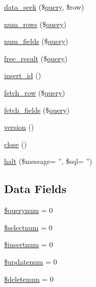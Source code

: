 \begin{DoxyCompactItemize}
\item 
\hyperlink{classdbstuff_a27a5c14df6b8da9758fdc49f38c78e7f}{data\+\_\+seek} (\$\hyperlink{classdbstuff_a00f34d535691c86e5674f6cace054c99}{query}, \$row)
\item 
\hyperlink{classdbstuff_abefe93c500ae2f81956a060a5c761c10}{num\+\_\+rows} (\$\hyperlink{classdbstuff_a00f34d535691c86e5674f6cace054c99}{query})
\item 
\hyperlink{classdbstuff_af6bbf353294db93d67b51384d7feaec5}{num\+\_\+fields} (\$\hyperlink{classdbstuff_a00f34d535691c86e5674f6cace054c99}{query})
\item 
\hyperlink{classdbstuff_acbf1b364d6744aa52ea3d1ec4ce34b1e}{free\+\_\+result} (\$\hyperlink{classdbstuff_a00f34d535691c86e5674f6cace054c99}{query})
\item 
\hyperlink{classdbstuff_a933f2cde8dc7f87875e257d0a4902e99}{insert\+\_\+id} ()
\item 
\hyperlink{classdbstuff_a7c2677bb5793761bc4ee3647101bbfe3}{fetch\+\_\+row} (\$\hyperlink{classdbstuff_a00f34d535691c86e5674f6cace054c99}{query})
\item 
\hyperlink{classdbstuff_a11fd1e4004990dbc0c40aa8826b46414}{fetch\+\_\+fields} (\$\hyperlink{classdbstuff_a00f34d535691c86e5674f6cace054c99}{query})
\item 
\hyperlink{classdbstuff_a6080dae0886626b9a4cedb29240708b1}{version} ()
\item 
\hyperlink{classdbstuff_aa69c8bf1f1dcf4e72552efff1fe3e87e}{close} ()
\item 
\hyperlink{classdbstuff_ac96ebadbc4514e82c1b8d9b1c12c9b5d}{halt} (\$message= '', \$sql= '')
\end{DoxyCompactItemize}
\subsection*{Data Fields}
\begin{DoxyCompactItemize}
\item 
\hyperlink{classdbstuff_aa48660dc81aca1df4d66ba6f6bcc5d32}{\$querynum} = 0
\item 
\hyperlink{classdbstuff_a7cdd79fa4be830e3f84d5aacd9e224a5}{\$selectnum} = 0
\item 
\hyperlink{classdbstuff_a232c3cd31f369358e47b8faaa3d364d3}{\$insertnum} = 0
\item 
\hyperlink{classdbstuff_ab62c1d782ea6e6d94b03f9edf4e0f147}{\$updatenum} = 0
\item 
\hyperlink{classdbstuff_a0fa8d352d49081815af6ea487f25e7c8}{\$deletenum} = 0
\end{DoxyCompactItemize}


